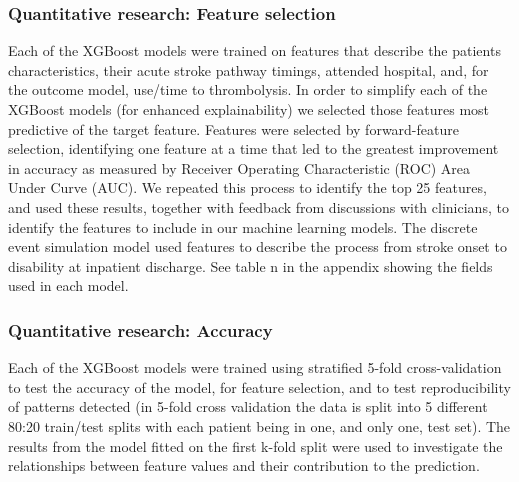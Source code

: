 \subsubsection{Quantitative research: Feature selection}

Each of the XGBoost models were trained on features that describe the patients characteristics, their acute stroke pathway timings, attended hospital, and, for the outcome model, use/time to thrombolysis. In order to simplify each of the XGBoost models (for enhanced explainability) we selected those features most predictive of the target feature. Features were selected by forward-feature selection, identifying one feature at a time that led to the greatest improvement in accuracy as measured by Receiver Operating Characteristic (ROC) Area Under Curve (AUC). We repeated this process to identify the top 25 features, and used these results, together with feedback from discussions with clinicians, to identify the features to include in our machine learning models. The discrete event simulation model used features to describe the process from stroke onset to disability at inpatient discharge. See table n in the appendix showing the fields used in each model.

\subsubsection{Quantitative research: Accuracy}

Each of the XGBoost models were trained using stratified 5-fold cross-validation to test the accuracy of the model, for feature selection, and to test reproducibility of patterns detected (in 5-fold cross validation the data is split into 5 different 80:20 train/test splits with each patient being in one, and only one, test set). The results from the model fitted on the first k-fold split were used to investigate the relationships between feature values and their contribution to the prediction.

